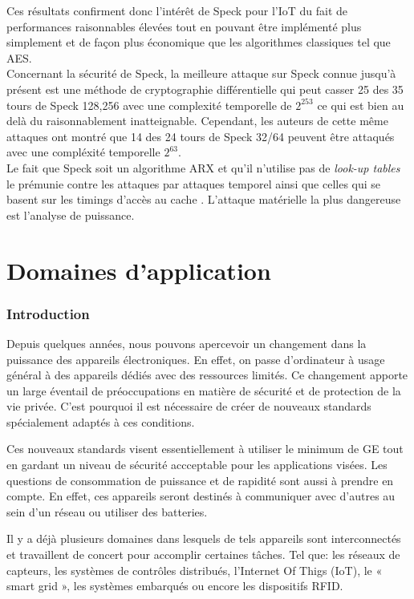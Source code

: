 Ces résultats confirment donc l'intérêt de Speck pour l'IoT du fait de performances
raisonnables élevées tout en pouvant être implémenté plus simplement et de façon
plus économique que	les algorithmes classiques tel que AES.  \\

Concernant la sécurité de Speck, la meilleure attaque sur Speck connue
jusqu'à présent est une méthode de cryptographie différentielle qui peut
casser 25 des 35 tours de Speck 128,256 avec une complexité temporelle de
$2^253$ \cite{speck_attack} ce qui est bien au delà du raisonnablement inatteignable.
Cependant, les auteurs de cette même attaques ont montré que 14 des 24
tours de Speck 32/64 peuvent être attaqués avec une compléxité temporelle $2^63$. \\


Le fait que Speck soit un algorithme ARX
et qu'il n'utilise pas de \textit{look-up tables} le prémunie contre
les attaques par attaques temporel ainsi que celles qui se basent sur les
timings d'accès au cache \cite{speck_design}. L'attaque matérielle
la plus dangereuse est l'analyse de puissance.


\newpage
\part{Domaines d'application}

\section{Introduction}


Depuis quelques années, nous pouvons apercevoir un changement dans la
puissance des appareils électroniques. En effet, on passe d'ordinateur à usage
général à des appareils dédiés avec des ressources limités. Ce changement
apporte un large éventail de préoccupations en matière de sécurité et de
protection de la vie privée. C'est pourquoi il est nécessaire de créer de
nouveaux standards spécialement adaptés à ces conditions.

Ces nouveaux standards visent essentiellement à utiliser le minimum de GE tout
en gardant un niveau de sécurité accceptable pour les applications visées. Les
questions de consommation de puissance et de rapidité sont aussi à prendre en
compte. En effet, ces appareils seront destinés à communiquer avec d'autres au
sein d'un réseau ou utiliser des batteries.

Il y a déjà plusieurs domaines dans lesquels de tels appareils sont
interconnectés et travaillent de concert pour accomplir certaines tâches.
Tel que: les réseaux de capteurs, les systèmes de contrôles
distribués, l'Internet Of Thigs (IoT), le « smart grid », les systèmes
embarqués ou encore les dispositifs RFID.

